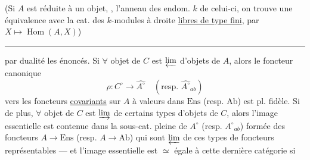 (Si $A$ est réduite à un objet, , l'anneau
des endom. $k$ de celui-ci, on
trouve une équivalence avec la
cat. des $k$-modules à droite
\uline{libres de type fini}, par $X\longmapsto\operatorname{Hom}(A,X)$)
\par\bigskip\hrule\bigskip
{} par dualité les énoncés.
Si $\forall$ objet de $C$ est $\varprojlim$
d'objets de $A$, alors le foncteur
canonique
\[
\rho:C^\circ\longrightarrow\widehat{A^\circ}
\quad(\text{resp. }\widehat{A^\circ}_{ab})
\]
vers les foncteurs
\uline{covariants} sur $A$ à valeurs dans
$\mathrm{Ens}$ (resp. $\mathrm{Ab}$) est pl. fidèle. Si
de plus, $\forall$ objet de $C$ est
$\varinjlim$ de certains types d'objets
de $C$, alors l'image essentielle est
contenue dans la sous-cat. pleine
de $\widehat{A^\circ}$ (resp. $\widehat{A^\circ}_{ab}$) formée des
foncteurs $A\longrightarrow\mathrm{Ens}$ (resp. $A\longrightarrow\mathrm{Ab}$)
qui sont $\varprojlim$ de ces types de
foncteurs représentables --- et
l'image essentielle est $\simeq$ égale à
cette dernière catégorie si
